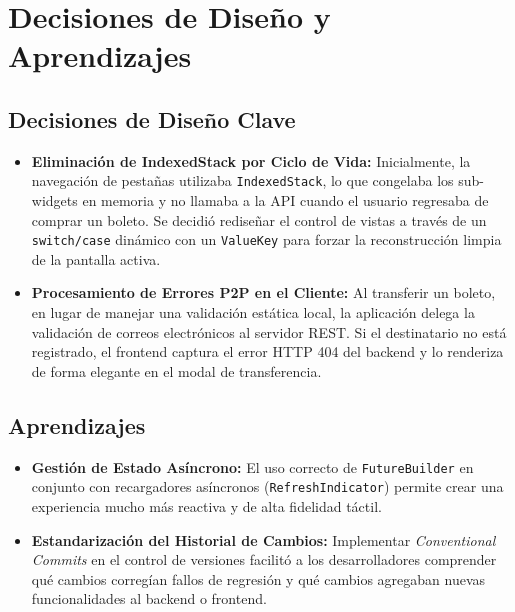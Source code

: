 \section{Decisiones de Diseño y Aprendizajes}

\subsection{Decisiones de Diseño Clave}
\begin{itemize}
    \item \textbf{Eliminación de IndexedStack por Ciclo de Vida:} 
    Inicialmente, la navegación de pestañas utilizaba \texttt{IndexedStack}, lo que congelaba los sub-widgets en memoria y no llamaba a la API cuando el usuario regresaba de comprar un boleto. Se decidió rediseñar el control de vistas a través de un \texttt{switch/case} dinámico con un \texttt{ValueKey} para forzar la reconstrucción limpia de la pantalla activa.
    \item \textbf{Procesamiento de Errores P2P en el Cliente:} 
    Al transferir un boleto, en lugar de manejar una validación estática local, la aplicación delega la validación de correos electrónicos al servidor REST. Si el destinatario no está registrado, el frontend captura el error HTTP 404 del backend y lo renderiza de forma elegante en el modal de transferencia.
\end{itemize}

\subsection{Aprendizajes}
\begin{itemize}
    \item \textbf{Gestión de Estado Asíncrono:} El uso correcto de \texttt{FutureBuilder} en conjunto con recargadores asíncronos (\texttt{RefreshIndicator}) permite crear una experiencia mucho más reactiva y de alta fidelidad táctil.
    \item \textbf{Estandarización del Historial de Cambios:} Implementar \textit{Conventional Commits} en el control de versiones facilitó a los desarrolladores comprender qué cambios corregían fallos de regresión y qué cambios agregaban nuevas funcionalidades al backend o frontend.
\end{itemize}
